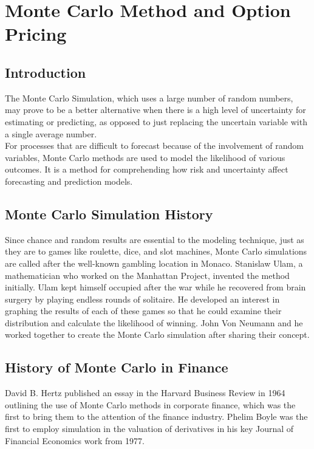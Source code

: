 
\chapter{Monte Carlo Method and Option Pricing}

\section{Introduction}
\noindent The Monte Carlo Simulation, which uses a large number of random numbers, may prove to be a better alternative when there is a high level of uncertainty for estimating or predicting, as opposed to just replacing the uncertain variable with a single average number.\\[2mm]
For processes that are difficult to forecast because of the involvement of random variables, Monte Carlo methods are used to model the likelihood of various outcomes. It is a method for comprehending how risk and uncertainty affect forecasting and prediction models.
\section{Monte Carlo Simulation History}
Since chance and random results are essential to the modeling technique, just as they are to games like roulette, dice, and slot machines, Monte Carlo simulations are called after the well-known gambling location in Monaco.
Stanislaw Ulam, a mathematician who worked on the Manhattan Project, invented the method initially. Ulam kept himself occupied after the war while he recovered from brain surgery by playing endless rounds of solitaire. He developed an interest in graphing the results of each of these games so that he could examine their distribution and calculate the likelihood of winning. John Von Neumann and he worked together to create the Monte Carlo simulation after sharing their concept.
\section{History of Monte Carlo in Finance}
David B. Hertz published an essay in the Harvard Business Review in 1964 outlining the use of Monte Carlo methods in corporate finance, which was the first to bring them to the attention of the finance industry. Phelim Boyle was the first to employ simulation in the valuation of derivatives in his key Journal of Financial Economics work from 1977.\\[2mm]

